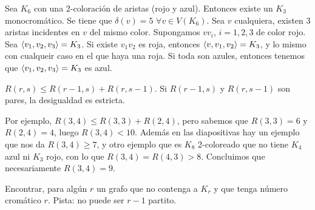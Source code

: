 \documentclass[TGyGC.tex]{subfiles}
\begin{document}
\begin{ej}
Sea $K_6$ con una 2-coloración de aristas (rojo y azul). Entonces existe un $K_3$ monocromático. Se tiene que $\delta(v)=5$ $\forall v\in V(K_6)$. Sea $v$ cualquiera, existen 3 aristas incidentes en $v$ del mismo color. Supongamos $vv_i$, $i=1,2,3$ de color rojo. Sea $\langle{v_1,v_2,v_3}\rangle=K_3$. Si existe $v_1v_2$ es roja, entonces $\langle{v,v_1, v_2}\rangle=K_3$, y lo mismo con cualqueir caso en el que haya una roja. Si toda son azules, entonces tenemos que $\langle{v_1,v_2,v_3}\rangle=K_3$ es azul.  
\end{ej}

\begin{teorema}
$R(r,s)\leq R(r-1,s)+R(r,s-1)$. Si $R(r-1,s)$ y $R(r,s-1)$ son pares, la desigualdad es estricta. 
\end{teorema}

Por ejemplo, $R(3,4)\leq R(3,3)+R(2,4)$, pero sabemos que $R(3,3)=6$ y $R(2,4)=4$, luego $R(3,4)<10$. Además en las diapositivas hay un ejemplo que nos da $R(3,4)\geq 7$, y otro ejemplo que es $K_8$ 2-coloreado que no tiene $K_4$ azul ni $K_3$ rojo, con lo que $R(3,4)=R(4,3)>8$. Concluimos que necesariamente $R(3,4)=9$. 

\begin{ejer}
Encontrar, para algún $r$ un grafo que no contenga a $K_r$ y que tenga número cromático $r$. Pista: no puede ser $r-1$ partito. 
\end{ejer}
\end{document}
